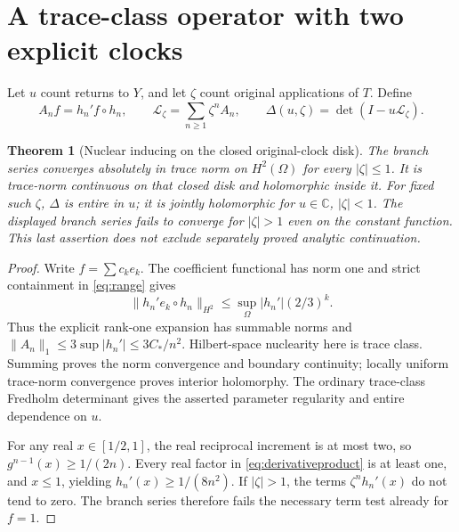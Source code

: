 \documentclass[10pt]{article}
\newcommand{\LL}{\mathcal L}
\newtheorem{theorem}{Theorem}
\begin{document}
\section{A trace-class operator with two explicit clocks}
Let $u$ count returns to $Y$, and let $\zeta$ count original applications of
$T$. Define
\begin{equation}
A_nf=h_n'f\circ h_n,\qquad
\LL_\zeta=\sum_{n\ge1}\zeta^n A_n,\qquad
\Delta(u,\zeta)=\det(I-u\LL_\zeta).
\label{eq:operator}
\end{equation}

\begin{theorem}[Nuclear inducing on the closed original-clock disk]
The branch series converges absolutely in trace norm on $H^2(\Omega)$ for
every $|\zeta|\le1$. It is trace-norm continuous on that closed disk and
holomorphic inside it. For fixed such $\zeta$, $\Delta$ is entire in $u$;
it is jointly holomorphic for $u\in\mathbb C$, $|\zeta|<1$.
The displayed branch series fails to converge for $|\zeta|>1$ even on the
constant function. This last assertion does not exclude separately proved
analytic continuation.
\end{theorem}
\begin{proof}
Write $f=\sum c_ke_k$. The coefficient functional has norm one and strict
containment in \eqref{eq:range} gives
\begin{equation}
\|h_n'e_k\circ h_n\|_{H^2}\le\sup_\Omega|h_n'|(2/3)^k.
\label{eq:rankone}
\end{equation}
Thus the explicit rank-one expansion has summable norms and
$\|A_n\|_1\le3\sup|h_n'|\le3C_*/n^2$. Hilbert-space nuclearity here is
trace class. Summing proves the norm convergence and boundary continuity;
locally uniform trace-norm convergence proves interior holomorphy. The
ordinary trace-class Fredholm determinant gives the asserted parameter
regularity and entire dependence on $u$.

For any real $x\in[1/2,1]$, the real reciprocal increment is at most two,
so $g^{n-1}(x)\ge1/(2n)$. Every real factor in
\eqref{eq:derivativeproduct} is at least one, and $x\le1$, yielding
$h_n'(x)\ge1/(8n^2)$. If $|\zeta|>1$, the terms
$\zeta^n h_n'(x)$ do not tend to zero. The branch series therefore fails
the necessary term test already for $f=1$.
\end{proof}
\end{document}
